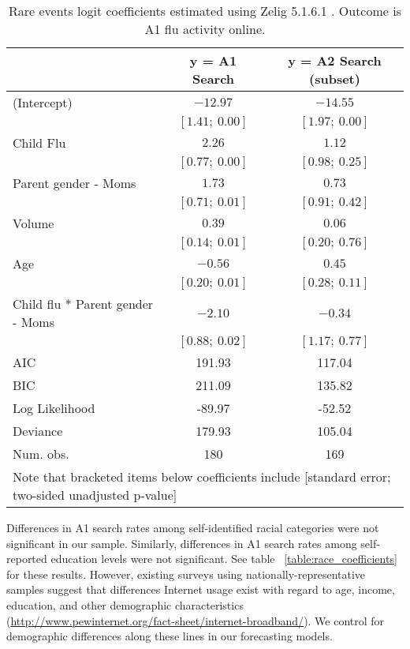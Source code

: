 \documentclass[12pt]{article}
\begin{document}
\begin{table}
\begin{center}
\begin{tabular}{l c c }
\hline
 & y = A1 Search & y = A2 Search (subset) \\
\hline
(Intercept)              & $-12.97$        & $-14.55$        \\
                         & $[1.41;\ 0.00]$ & $[1.97;\ 0.00]$ \\
Child Flu                   & $2.26$          & $1.12$          \\
                         & $[0.77;\ 0.00]$ & $[0.98;\ 0.25]$ \\
Parent gender - Moms        & $1.73$          & $0.73$          \\
                         & $[0.71;\ 0.01]$ & $[0.91;\ 0.42]$ \\
Volume                   & $0.39$          & $0.06$          \\
                         & $[0.14;\ 0.01]$ & $[0.20;\ 0.76]$ \\
Age                      & $-0.56$         & $0.45$          \\
                         & $[0.20;\ 0.01]$ & $[0.28;\ 0.11]$ \\
Child flu * Parent gender - Moms & $-2.10$         & $-0.34$         \\
                         & $[0.88;\ 0.02]$ & $[1.17;\ 0.77]$ \\
\hline
AIC                      & 191.93          & 117.04          \\
BIC                      & 211.09          & 135.82          \\
Log Likelihood           & -89.97          & -52.52          \\
Deviance                 & 179.93          & 105.04          \\
Num. obs.                & 180             & 169             \\
\hline
\multicolumn{3}{l}{\scriptsize{Note that bracketed items below coefficients include [standard error; two-sided unadjusted p-value]}}
\end{tabular}
\caption{Rare events logit coefficients estimated using Zelig 5.1.6.1 \citep{choirat_etal_2020}. Outcome is A1 flu activity online.}
\label{table:coefficients_parents}
\end{center}
\end{table}

Differences in A1 search rates among self-identified racial categories were not significant in our sample. Similarly, differences in A1 search rates among self-reported education levels were not significant. See table ~\ref{table:race_coefficients} for these results. However, existing surveys using nationally-representative samples suggest that differences Internet usage exist with regard to age, income, education, and other demographic characteristics (\url{http://www.pewinternet.org/fact-sheet/internet-broadband/}). We control for demographic differences along these lines in our forecasting models. 
\end{document}
